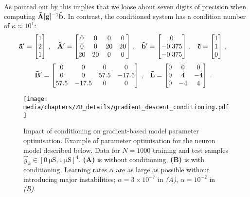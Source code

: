 As pointed out by \citet[Section~8.4, p.~406]{cheney2012numerical} this implies that we loose about seven digits of precision when computing $\mathbf{\tilde A}[\mathbf{g}]^{-1} \mathbf{\tilde b}$.
In contrast, the conditioned system has a condition number of $\kappa \approx 10^1$:
\begin{align*}
	\mathbf{\tilde a}' &= \begin{bmatrix}
		1 \\
		2 \\
		1
	\end{bmatrix} \,,
	&
	\mathbf{\tilde A}' &= \begin{bmatrix}
		0 & 0 & 0 & 0 \\
		0 & 0 & 20 & 20 \\
		20 & 20 & 0 & 0
	\end{bmatrix} \,,
	&
	\mathbf{\tilde b}' &= \begin{bmatrix}
		0 \\
		-0.375 \\
		-0.375
	\end{bmatrix} \,,
	&
	\mathbf{\tilde c} &=
	\begin{bmatrix}
		1 \\
		1 \\
		0
	\end{bmatrix} \,,
\end{align*}\vspace*{-0.125em}
\begin{align*}
	\mathbf{\tilde B}' &=
	\begin{bmatrix}
		0 & 0 & 0 & 0 \\
		0 & 0 & 57.5 & -17.5 \\
		57.5 & -17.5 & 0 & 0 \\
	\end{bmatrix} \,,
	&
	\mathbf{\tilde L} &=
	\begin{bmatrix}
		0 & 0 & 0 \\
		0 & 4 & -4 \\
		0 & -4 & 4 \\
	\end{bmatrix} \,.
\end{align*}


\begin{figure}
	\texttt{[image: media/chapters/ZB\_details/gradient\_descent\_conditioning.pdf]}
	\caption[Impact of conditioning on gradient-based model parameter optimisation]{Impact of conditioning on gradient-based model parameter optimisation.
	Example of parameter optimisation for the neuron model described below.
	Data for $N = 1000$ training and test samples $\vec g_k \in [\SI{0}{\micro\siemens}, \SI{1}{\micro\siemens}]^4$.
	\textbf{(A)} is without conditioning, \textbf{(B)} is with conditioning.
	Learning rates $\alpha$ are as large as possible without introducing major instabilities; $\alpha = 3 \times 10^{-7}$ in \emph{(A)}, $\alpha = 10^{-2}$ in \emph{(B)}.}
	\label{fig:gradient_descent_conditioning}
\end{figure}

